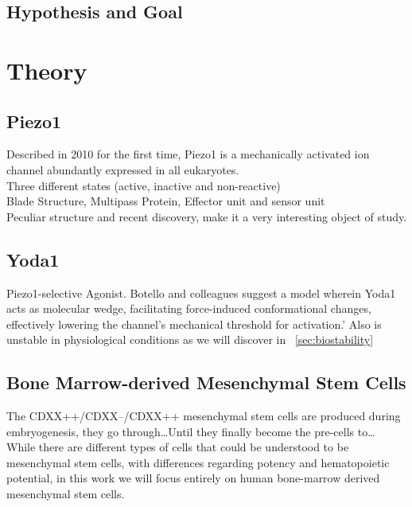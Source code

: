 \subsection{Hypothesis and Goal}




\section{Theory}

\subsection{Piezo1}
Described in 2010 for the first time, Piezo1 is a  mechanically activated ion channel abundantly expressed in all eukaryotes.\cite{Coste55} \\
Three different states (active, inactive and non-reactive)\\
Blade Structure, Multipass Protein, Effector unit and sensor unit\\
Peculiar structure and recent discovery, make it a very interesting object of study. 

\subsection{Yoda1}
Piezo1-selective Agonist.
Botello and colleagues suggest a model wherein Yoda1 acts as molecular wedge, facilitating force-induced conformational changes, effectively lowering the channel's mechanical threshold for activation.'\cite{BotelloSmith.2019} Also is unstable in physiological conditions as we will discover in ~\vref{sec:biostability} 

\subsection{Bone Marrow-derived Mesenchymal Stem Cells}
The CDXX++/CDXX--/CDXX++ mesenchymal stem cells are produced during embryogenesis, they go through\dots Until they finally become the pre-cells to\dots 
While there are different types of cells that could be understood to be mesenchymal stem cells, with differences regarding potency and hematopoietic potential, in this work we will focus entirely on human bone-marrow derived mesenchymal stem cells. 

